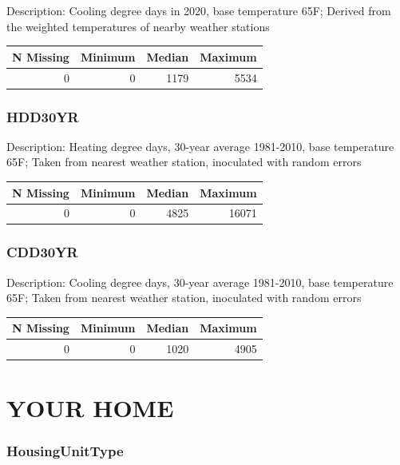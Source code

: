 \documentclass[
]{krantz}
\begin{document}
Description: Cooling degree days in 2020, base temperature 65F; Derived from the weighted temperatures of nearby weather stations

\begin{tabular}[t]{r|r|r|r}
\hline
N Missing & Minimum & Median & Maximum\\
\hline
0 & 0 & 1179 & 5534\\
\hline
\end{tabular}

\hypertarget{hdd30yr}{%
\subsubsection*{HDD30YR}\label{hdd30yr}}


Description: Heating degree days, 30-year average 1981-2010, base temperature 65F; Taken from nearest weather station, inoculated with random errors

\begin{tabular}[t]{r|r|r|r}
\hline
N Missing & Minimum & Median & Maximum\\
\hline
0 & 0 & 4825 & 16071\\
\hline
\end{tabular}

\hypertarget{cdd30yr}{%
\subsubsection*{CDD30YR}\label{cdd30yr}}


Description: Cooling degree days, 30-year average 1981-2010, base temperature 65F; Taken from nearest weather station, inoculated with random errors

\begin{tabular}[t]{r|r|r|r}
\hline
N Missing & Minimum & Median & Maximum\\
\hline
0 & 0 & 1020 & 4905\\
\hline
\end{tabular}

\hypertarget{your-home}{%
\section{YOUR HOME}\label{your-home}}

\hypertarget{housingunittype}{%
\subsubsection*{HousingUnitType}\label{housingunittype}}
\end{document}
